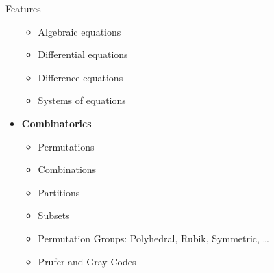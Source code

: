 \documentclass[xcolor=svgnames]{beamer}
\begin{document}
\begin{frame}{Features}
\begin{multicols}{2}
\begin{itemize}
\begin{itemize}
      \item Algebraic equations
      \item Differential equations
      \item Difference equations
      \item Systems of equations
      \end{itemize}
    \item \textbf{Combinatorics}
      \begin{itemize}
        \tiny
      \item Permutations
      \item Combinations
      \item Partitions
      \item Subsets
      \item Permutation Groups: Polyhedral, Rubik, Symmetric, \ldots
      \item Prufer and Gray Codes
      \end{itemize}

      \end{itemize}
      \end{multicols}
    \end{frame}
\end{document}
